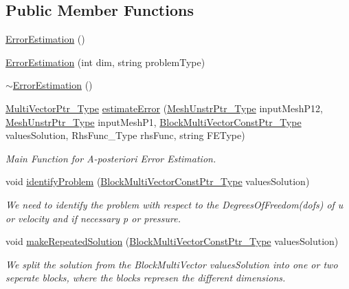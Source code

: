 \subsection*{Public Member Functions}
\begin{DoxyCompactItemize}
\item 
\hyperlink{classFEDD_1_1ErrorEstimation_a0d1a5ec84042b8ff0f7bb1375a4d77bd}{Error\+Estimation} ()
\item 
\hyperlink{classFEDD_1_1ErrorEstimation_af56fe03f577d1b1ea7fc9ae970333ce3}{Error\+Estimation} (int dim, string problem\+Type)
\item 
\hyperlink{classFEDD_1_1ErrorEstimation_a98bcec4b2275c1f1a32607f9b427e884}{$\sim$\+Error\+Estimation} ()
\item 
\hyperlink{classFEDD_1_1ErrorEstimation_a5882ff373bf8c409b407b4fd1f42bda0}{Multi\+Vector\+Ptr\+\_\+\+Type} \hyperlink{classFEDD_1_1ErrorEstimation_ac2961578854f4f3c90d49e0f153cf379}{estimate\+Error} (\hyperlink{classFEDD_1_1ErrorEstimation_a862043dc355a1524640b5ef53e8eefa1}{Mesh\+Unstr\+Ptr\+\_\+\+Type} input\+Mesh\+P12, \hyperlink{classFEDD_1_1ErrorEstimation_a862043dc355a1524640b5ef53e8eefa1}{Mesh\+Unstr\+Ptr\+\_\+\+Type} input\+Mesh\+P1, \hyperlink{classFEDD_1_1ErrorEstimation_a8a53d809dfcf71abaffe46f85e6b4aa1}{Block\+Multi\+Vector\+Const\+Ptr\+\_\+\+Type} values\+Solution, Rhs\+Func\+\_\+\+Type rhs\+Func, string F\+E\+Type)
\begin{DoxyCompactList}\small\item\em Main Function for A-\/posteriori Error Estimation. \end{DoxyCompactList}\item 
void \hyperlink{classFEDD_1_1ErrorEstimation_a590f7b920955acbc096854c5de775c58}{identify\+Problem} (\hyperlink{classFEDD_1_1ErrorEstimation_a8a53d809dfcf71abaffe46f85e6b4aa1}{Block\+Multi\+Vector\+Const\+Ptr\+\_\+\+Type} values\+Solution)
\begin{DoxyCompactList}\small\item\em We need to identify the problem with respect to the Degrees\+Of\+Freedom(dofs) of u or velocity and if necessary p or pressure. \end{DoxyCompactList}\item 
void \hyperlink{classFEDD_1_1ErrorEstimation_afda1d9f1ed233fd231cd68e74a3dfb56}{make\+Repeated\+Solution} (\hyperlink{classFEDD_1_1ErrorEstimation_a8a53d809dfcf71abaffe46f85e6b4aa1}{Block\+Multi\+Vector\+Const\+Ptr\+\_\+\+Type} values\+Solution)
\begin{DoxyCompactList}\small\item\em We split the solution from the Block\+Multi\+Vector values\+Solution into one or two seperate blocks, where the blocks represen the different dimensions. \end{DoxyCompactList}\item 

\end{DoxyCompactItemize}
